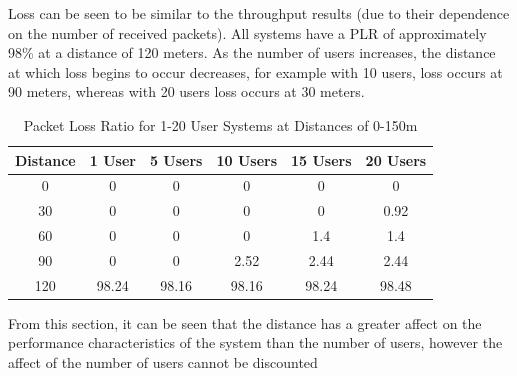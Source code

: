 Loss can be seen to be similar to the throughput results (due to their
dependence on the number of received packets). All systems have a PLR of
approximately 98\% at a distance of 120 meters. As the number of users
increases, the distance at which loss begins to occur decreases, for example
with 10 users, loss occurs at 90 meters, whereas with 20 users loss occurs at 30
meters.

\begin{table}[H]
	\centering
	\caption{Packet Loss Ratio for 1-20 User Systems at Distances of 0-150m}
	\label{tab:QCP3TPTable}
	\begin{tabular}{|c|c|c|c|c|c|}
		\hline
		Distance & 1 User & 5 Users & 10 Users & 15 Users & 20 Users\\
		\hline
		0 & 0 & 0 & 0 & 0 & 0\\
		30 & 0 & 0 & 0 & 0 & 0.92\\
		60 & 0 & 0 & 0 & 1.4 & 1.4\\
		90 & 0 & 0 & 2.52 & 2.44 & 2.44\\
		120 & 98.24 & 98.16 & 98.16 & 98.24 & 98.48\\
		\hline
	\end{tabular}
\end{table}

From this section, it can be seen that the distance has a greater affect on the
performance characteristics of the system than the number of users, however the
affect of the number of users cannot be discounted
